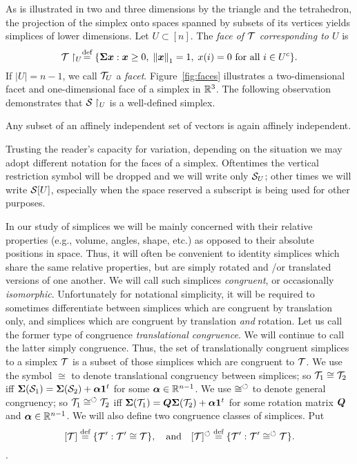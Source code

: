 As is illustrated in two and three dimensions by the triangle and the tetrahedron, the projection of the simplex onto spaces spanned by subsets of its vertices yields simplices of lower dimensions. Let $U\subset [n]$. The \emph{face of $\mathcal{T}$ corresponding to $U$} is 
\begin{equation}
\label{eq:T_U}
    \mathcal{T}\restriction_U \overset{\text{def}}{=} \{\boldsymbol{\Sigma}\vb*{x}: \vb*{x}\geq 0,\;\norm{\vb*{x}}_1=1,\;x(i)=0\text{ for all }i\in U^c\}.
\end{equation}
If $|U|=n-1$, we call $\mathcal{T}_U$ a \emph{facet}. Figure~\ref{fig:faces} illustrates a two-dimensional   facet and one-dimensional  face of a simplex in $\mathbb{R}^3$. The following observation demonstrates that $\mathcal{S}\restriction_U$ is a well-defined simplex. 
\begin{observation}
	\label{obs:subset_affinely_independent}
	Any subset of an affinely independent set of vectors is again affinely independent. 
\end{observation}

Trusting the reader's capacity for variation, depending on the situation we may adopt different notation for the faces of a simplex. Oftentimes the vertical restriction symbol will be dropped and we will write only $\mathcal{S}_U$; other times we will write $\mathcal{S}[U]$, especially when the space reserved a subscript is being used for other purposes. 

In  our study of simplices we will be mainly concerned with their relative properties (e.g., volume, angles, shape, etc.) as opposed to their absolute  positions in space. Thus, it will often  be convenient to identity simplices which share the same relative properties, but are simply rotated and /or translated versions of one  another. We will call  such simplices \emph{congruent},  or occasionally \emph{isomorphic}. 
Unfortunately for notational simplicity, it will be  required to  sometimes differentiate between simplices  which are congruent by translation only, and simplices which are congruent by translation \emph{and} rotation. Let us  call the former type of congruence \emph{translational congruence}. We will continue to  call the latter simply congruence. Thus, the set of translationally congruent simplices to a simplex $\mathcal{T}$ is a subset of  those simplices which are congruent to $\mathcal{T}$. 
We use the symbol $\cong$ to denote translational congruency between simplices; so $\mathcal{T}_1\cong\mathcal{T}_2$ iff $\boldsymbol{\Sigma}(\mathcal{S}_1)=\boldsymbol{\Sigma}(\mathcal{S}_2) + \vb*{\alpha}\vb{1}^t$ for some $\vb*{\alpha}\in\mathbb{R}^{n-1}$. We use $\cong^\circlearrowleft$  to denote general   congruency; so  $\mathcal{T}_1\cong^\circlearrowleft\mathcal{T}_2$ iff  $\boldsymbol{\Sigma}(\mathcal{T}_1)=\vb*{Q}\boldsymbol{\Sigma}(\mathcal{T}_2) + \vb*{\alpha}\vb{1}^t$ for some rotation matrix $\vb*{Q}$  and $\vb*{\alpha}\in\mathbb{R}^{n-1}$. 
We will  also define two congruence classes of simplices. Put
\begin{equation}
\label{eq:[ssplx]}
[\mathcal{T}] \overset{\text{def}}{=} \{\mathcal{T}': \mathcal{T}'\cong\mathcal{T}\},\quad \text{and} \quad [\mathcal{T}]^\circlearrowleft\overset{\text{def}}{=} \{\mathcal{T}':\mathcal{T}'\cong^\circlearrowleft\mathcal{T}\}.
\end{equation}.

